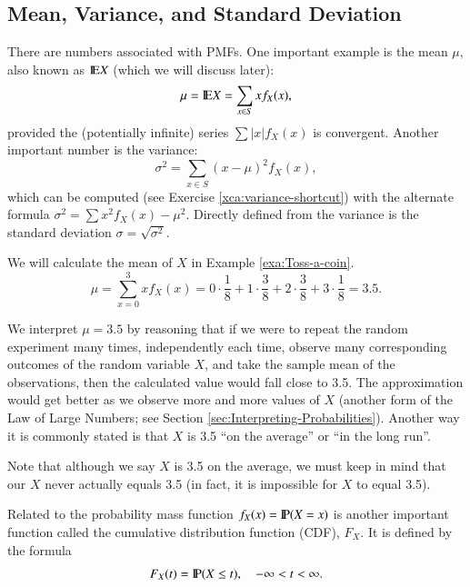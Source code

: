 \documentclass[captions=tableheading]{scrbook}
\begin{document}
\subsection{Mean, Variance, and Standard Deviation}
\label{sec-1-1-2}

\label{sub:mean-variance-sd}

There are numbers associated with PMFs. One important example is the mean \(\mu\), also known as \(\E X\) (which we will discuss later):
\begin{equation}
\mu=\E X=\sum_{x\in S}xf_{X}(x),
\end{equation}
provided the (potentially infinite) series \(\sum|x|f_{X}(x)\) is convergent. Another important number is the variance:
\begin{equation}
\sigma^{2}=\sum_{x\in S}(x-\mu)^{2}f_{X}(x),
\end{equation}
which can be computed (see Exercise \ref{xca:variance-shortcut}) with the alternate formula \(\sigma^{2}=\sum x{}^{2}f_{X}(x)-\mu^{2}\). Directly defined from the variance is the standard deviation \(\sigma=\sqrt{\sigma^{2}}\).
 
\begin{example}
\label{exa:disc-pmf-mean}
We will calculate the mean of \(X\) in Example \ref{exa:Toss-a-coin}.
\[
\mu=\sum_{x=0}^{3}xf_{X}(x)=0\cdot\frac{1}{8}+1\cdot\frac{3}{8}+2\cdot\frac{3}{8}+3\cdot\frac{1}{8}=3.5.
\]

We interpret \(\mu=3.5\) by reasoning that if we were to repeat the random experiment many times, independently each time, observe many corresponding outcomes of the random variable \(X\), and take the sample mean of the observations, then the calculated value would fall close to 3.5. The approximation would get better as we observe more and more values of \(X\) (another form of the Law of Large Numbers; see Section \ref{sec:Interpreting-Probabilities}). Another way it is commonly stated is that \(X\) is 3.5 ``on the average'' or ``in the long run''.

\end{example}

\begin{rem}
Note that although we say \(X\) is 3.5 on the average, we must keep in mind that our \(X\) never actually equals 3.5 (in fact, it is impossible for \(X\) to equal 3.5).
\end{rem}

Related to the probability mass function \(f_{X}(x)=\P(X=x)\) is another important function called the cumulative distribution function (CDF), \(F_{X}\). It is defined by the formula
\begin{equation}
F_{X}(t)=\P(X\leq t),\quad-\infty<t<\infty.
\end{equation}
\end{document}
